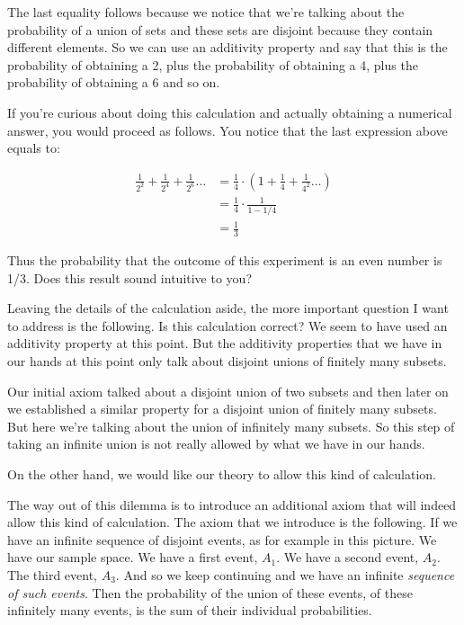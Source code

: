 \documentclass{tufte-handout}
\begin{document}
The last equality follows because we notice that we're talking about the probability of a union of sets and these sets are
disjoint because they contain different elements. So we can use an additivity property and say that this
is the probability of obtaining a 2, plus the probability of obtaining a 4, plus the probability of obtaining a
6 and so on.

If you're curious about doing this calculation and actually obtaining a numerical answer, you would
proceed as follows. You notice that the last expression above equals to:

\begin{align*}
\frac{1}{2^2} + \frac{1}{2^4} + \frac{1}{2^6}  \ldots &=  \frac{1}{4} \cdot (1 + \frac{1}{4} + \frac{1}{4^2}  \ldots )\\
  &=  \frac{1}{4} \cdot  \frac{1}{ 1 -  1/4} \\
 &= \frac{1}{3} 
\end{align*}

Thus the probability that the outcome of this experiment is an even number is 1/3. Does this result sound intuitive to you?

Leaving the details of the calculation aside, the more important question I want to address is the
following. Is this calculation correct? We seem to have used an additivity property at this point. But the
additivity properties that we have in our hands at this point only talk about disjoint unions of finitely
many subsets.

Our initial axiom talked about a disjoint union of two subsets and then later on we established a similar
property for a disjoint union of finitely many subsets. But here we're talking about the union of infinitely
many subsets. So this step of taking an infinite union is not really allowed by what we have in our hands. 

On the other hand,
we would like our theory to allow this kind of calculation.

The way out of this dilemma is to introduce an additional axiom that will indeed allow this kind of
calculation. The axiom that we introduce is the following. If we have an infinite sequence of disjoint
events, as for example in this picture. We have our sample space. We have a first event, $A_1$. We have a
second event, $A_2$. The third event, $A_3$. And so we keep continuing and we have an infinite \textit{sequence of
such events}. Then the probability of the union of these events, of these infinitely many events, is the
sum of their individual probabilities.
\end{document}
